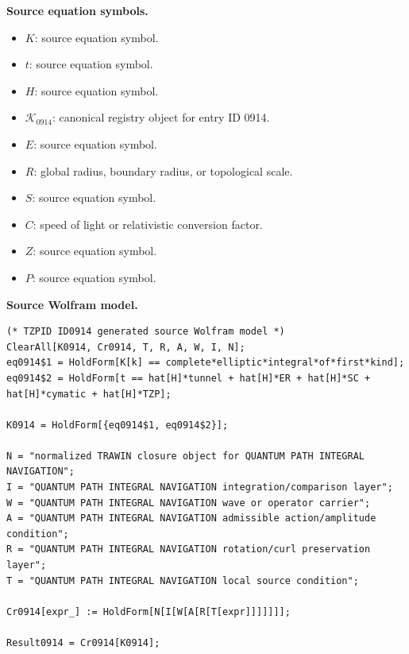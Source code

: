 \begin{minipage}[t]{0.49\linewidth}
\begingroup
\small
\raggedright
\textbf{Source equation symbols.}\par
\begin{itemize}[leftmargin=1.35em,itemsep=1pt,topsep=1pt,parsep=0pt]
    \item $K$: source equation symbol.
    \item $t$: source equation symbol.
    \item $H$: source equation symbol.
    \item $\mathcal{K}_{0914}$: canonical registry object for entry ID 0914.
    \item $E$: source equation symbol.
    \item $R$: global radius, boundary radius, or topological scale.
    \item $S$: source equation symbol.
    \item $C$: speed of light or relativistic conversion factor.
    \item $Z$: source equation symbol.
    \item $P$: source equation symbol.
\end{itemize}
\endgroup
\end{minipage}\hfill
\begin{minipage}[t]{0.47\linewidth}
\begingroup
\scriptsize
\raggedright
\textbf{Source Wolfram model.}\par
\begin{Verbatim}[fontsize=\tiny,breaklines=true,breakanywhere=true]
(* TZPID ID0914 generated source Wolfram model *)
ClearAll[K0914, Cr0914, T, R, A, W, I, N];
eq0914$1 = HoldForm[K[k] == complete*elliptic*integral*of*first*kind];
eq0914$2 = HoldForm[t == hat[H]*tunnel + hat[H]*ER + hat[H]*SC + hat[H]*cymatic + hat[H]*TZP];

K0914 = HoldForm[{eq0914$1, eq0914$2}];

N = "normalized TRAWIN closure object for QUANTUM PATH INTEGRAL NAVIGATION";
I = "QUANTUM PATH INTEGRAL NAVIGATION integration/comparison layer";
W = "QUANTUM PATH INTEGRAL NAVIGATION wave or operator carrier";
A = "QUANTUM PATH INTEGRAL NAVIGATION admissible action/amplitude condition";
R = "QUANTUM PATH INTEGRAL NAVIGATION rotation/curl preservation layer";
T = "QUANTUM PATH INTEGRAL NAVIGATION local source condition";

Cr0914[expr_] := HoldForm[N[I[W[A[R[T[expr]]]]]]];

Result0914 = Cr0914[K0914];
\end{Verbatim}
\endgroup
\end{minipage}

